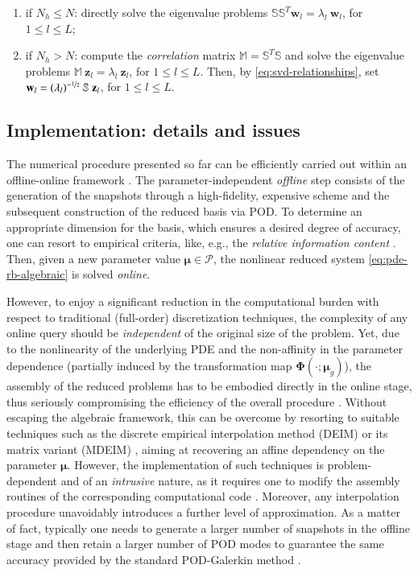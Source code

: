 \documentclass[longtitle]{elsarticle}
\numberwithin{equation}{section}
\theoremstyle{theorem}
\theoremstyle{definition}
\theoremstyle{remark}
\theoremstyle{proposition}
\numberwithin{figure}{section}
\newcommand{\bg}[1]{\boldsymbol{#1}}
\begin{document}
		\begin{enumerate}[label=(\alph*)]
			\item if ${N_h} \leq N$: directly solve the eigenvalue problems $\mathbb{S} \mathbb{S}^T \mathbf{w}_l = \lambda_l ~ \mathbf{w}_l$, for $1 \leq l \leq L$;
			\item if ${N_h} > N$: compute the \emph{correlation} matrix $\mathbb{M} = \mathbb{S}^T \mathbb{S}$ and solve the eigenvalue problems $\mathbb{M} ~ \mathbf{z}_l = \lambda_l ~ \mathbf{z}_l$, for $1 \leq l \leq L$. Then, by \eqref{eq:svd-relationships}, set $\mathbf{w}_l = (\lambda_l)^{-\nicefrac{1}{2}} ~ \mathbb{S} ~ \mathbf{z}_l$, for $1 \leq l \leq L$.
		\end{enumerate}
		
			
	
	\subsection{Implementation: details and issues}
	\label{section:Implementation: details and issues}
	
		The numerical procedure presented so far can be efficiently carried out within an offline-online framework \cite{Pru02}. The parameter-independent \emph{offline} step consists of the generation of the snapshots through a high-fidelity, expensive scheme and the subsequent construction of the reduced basis via POD. To determine an appropriate dimension for the basis, which ensures a desired degree of accuracy, one can resort to empirical criteria, like, e.g., the \emph{relative information content} \cite{QMN15}. Then, given a new parameter value $\bg{\mu} \in \mathcal{P}$, the nonlinear reduced system \eqref{eq:pde-rb-algebraic} is solved \emph{online}.				

		However, to enjoy a significant reduction in the computational burden with respect to traditional (full-order) discretization techniques, the complexity of any online query should be \emph{independent} of the original size of the problem. Yet, due to the nonlinearity of the underlying PDE and the non-affinity in the parameter dependence (partially induced by the transformation map $\bg{\Phi}(\cdot; \bg{\mu}_g)$), the assembly of the reduced problems has to be embodied directly in the online stage, thus seriously compromising the efficiency of the overall procedure \cite{Bar04}. Without escaping the algebraic framework, this can be overcome by resorting to suitable techniques such as the discrete empirical interpolation method (DEIM) \cite{Cha10} or its matrix variant (MDEIM) \cite{NMA15}, aiming at recovering an affine dependency on the parameter $\bg{\mu}$. However, the implementation of such techniques is problem-dependent and of an \emph{intrusive} nature, as it requires one to modify the assembly routines of the corresponding computational code \cite{Cas15}. Moreover, any interpolation procedure unavoidably introduces a further level of approximation. As a matter of fact, typically one needs to generate a larger number of snapshots in the offline stage and then retain a larger number of POD modes to guarantee the same accuracy provided by the standard POD-Galerkin method \cite{Bar04}.		
		
\end{document}
